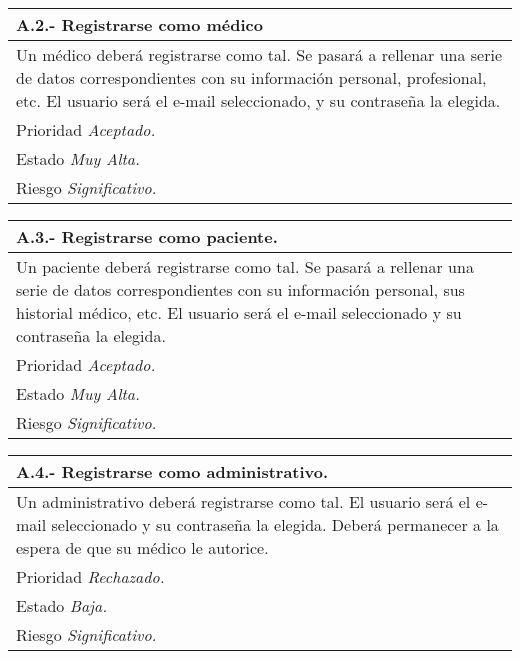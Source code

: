 \documentclass[a4paper,oneside,11pt]{book}
\begin{document}
\begin{center}
\begin{tabulary}{15cm}{|L|}
	\hline
		\bf{A.2.- Registrarse como médico} \\
	\hline
		Un médico deberá registrarse como tal. Se pasará a rellenar una serie de datos correspondientes con su información personal, profesional, etc. El usuario será el e-mail seleccionado, y su contraseña la elegida.\\
	\hline
		Prioridad \textit{Aceptado.} \\
	\hline
		Estado \textit{Muy Alta.} \\
	\hline
		Riesgo \textit{Significativo.} \\
	\hline
\end{tabulary}
\end{center}

\begin{center}
\begin{tabulary}{15cm}{|L|}
	\hline
		\bf{A.3.- Registrarse como paciente.} \\
	\hline
		Un paciente deberá registrarse como tal. Se pasará a rellenar una serie de datos correspondientes con su información personal, sus historial médico, etc. El usuario será el e-mail seleccionado y su contraseña la elegida. \\
	\hline
		Prioridad \textit{Aceptado.} \\
	\hline
		Estado \textit{Muy Alta.} \\
	\hline
		Riesgo \textit{Significativo.} \\
	\hline
\end{tabulary}
\end{center}

\begin{center}
\begin{tabulary}{15cm}{|L|}
	\hline
		\bf{A.4.- Registrarse como administrativo.} \\
	\hline
		Un administrativo deberá registrarse como tal. El usuario será el e-mail seleccionado y su contraseña la elegida. Deberá permanecer a la espera de que su médico le autorice. \\
	\hline
		Prioridad \textit{Rechazado.} \\
	\hline
		Estado \textit{Baja.} \\
	\hline
		Riesgo \textit{Significativo.} \\
	\hline
\end{tabulary}
\end{center}
\end{document}
